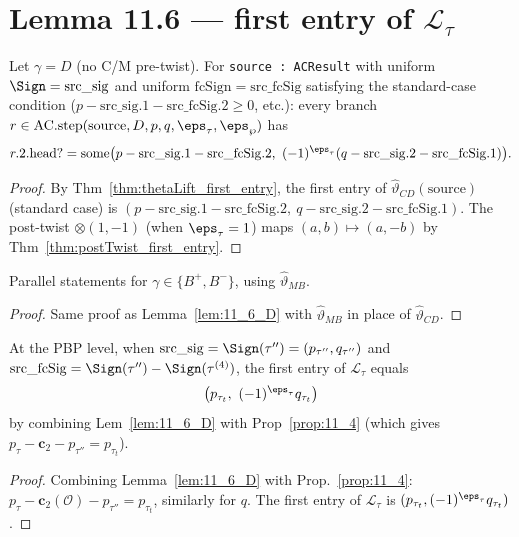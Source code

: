 \section{Lemma 11.6 — first entry of $\mathcal{L}_\tau$}

\begin{lemma}
  \label{lem:11_6_D}
  \leanok
  Let $\gamma = D$ (no C/M pre-twist). For \texttt{source : ACResult} with uniform
  $\Sign = \mathrm{src\_sig}$ and uniform $\mathrm{fcSign} = \mathrm{src\_fcSig}$ satisfying the
  standard-case condition ($p - \mathrm{src\_sig}.1 - \mathrm{src\_fcSig}.2 \geq 0$, etc.):
  every branch $r \in \mathrm{AC.step}(\mathrm{source}, D, p, q, \eps_\tau, \eps_\wp)$ has
  \[ r.2.\mathrm{head?} = \mathrm{some}\big(p - \mathrm{src\_sig}.1 - \mathrm{src\_fcSig}.2,\ (-1)^{\eps_\tau}(q - \mathrm{src\_sig}.2 - \mathrm{src\_fcSig}.1)\big). \]
\end{lemma}

\begin{proof}
  \leanok
  By Thm~\ref{thm:thetaLift_first_entry}, the first entry of $\hat\vartheta_{CD}(\mathrm{source})$ (standard case) is
  $(p - \mathrm{src\_sig}.1 - \mathrm{src\_fcSig}.2,\ q - \mathrm{src\_sig}.2 - \mathrm{src\_fcSig}.1)$.
  The post-twist $\otimes(1, -1)$ (when $\eps_\tau = 1$) maps $(a, b) \mapsto (a, -b)$ by Thm~\ref{thm:postTwist_first_entry}.
\end{proof}

\begin{lemma}[Lemma 11.6 $B^+ / B^-$]
  \label{lem:11_6_B}
  \leanok
  Parallel statements for $\gamma \in \{B^+, B^-\}$, using $\hat\vartheta_{MB}$.
\end{lemma}
\begin{proof}
  \leanok
  Same proof as Lemma~\ref{lem:11_6_D} with $\hat\vartheta_{MB}$ in place of $\hat\vartheta_{CD}$.
\end{proof}


\begin{corollary}
  \label{cor:11_6_pbp}
  \leanok
  At the PBP level, when $\mathrm{src\_sig} = \Sign(\tau'') = (p_{\tau''}, q_{\tau''})$
  and $\mathrm{src\_fcSig} = \Sign(\tau'') - \Sign(\tau^{(4)})$, the first entry of
  $\mathcal{L}_\tau$ equals
  \[ \big(p_{\tau_t},\ (-1)^{\eps_\tau} q_{\tau_t}\big) \]
  by combining Lem~\ref{lem:11_6_D} with Prop~\ref{prop:11_4} (which gives $p_\tau - \mathbf{c}_2 - p_{\tau''} = p_{\tau_t}$).
\end{corollary}
\begin{proof}
  \leanok
  Combining Lemma~\ref{lem:11_6_D} with Prop.~\ref{prop:11_4}: $p_\tau - \mathbf{c}_2(\mathcal{O}) - p_{\tau''} = p_{\tau_t}$, similarly for $q$. The first entry of $\mathcal{L}_\tau$ is $(p_{\tau_t}, (-1)^{\eps_\tau} q_{\tau_t})$.
\end{proof}



